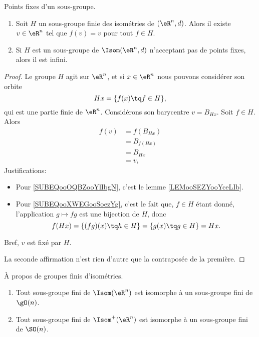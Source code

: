 \begin{proposition}     \label{PROPooLAEBooWdcBoe}
    Points fixes d'un sous-groupe.
    \begin{enumerate}
        \item
            Soit \( H\) un sous-groupe finie des isométries de \( (\eR^n,d)\). Alors il existe \( v\in \eR^n\) tel que \( f(v)=v\) pour tout \( f\in H\).
        \item
            Si \( H\) est un sous-groupe de \( \Isom(\eR^n,d)\) n'acceptant pas de points fixes, alors il est infini.
    \end{enumerate}
\end{proposition}

\begin{proof}
    Le groupe \( H\) agit sur \( \eR^n\), et si \( x\in \eR^n\) nous pouvons considérer son orbite 
    \begin{equation}
        Hx=\{f(x)\tq f\in H\},
    \end{equation}
    qui est une partie finie de \( \eR^n\). Considérons son barycentre $v=B_{Hx}$. Soit \( f\in H\). Alors  
    \begin{subequations}
        \begin{align}
            f(v)&=f(B_{Hx})\\
            &=B_{f(Hx)}     \label{SUBEQooOQBZooYlIbgN}\\
            &=B_{Hx}        \label{SUBEQooXWEGooSoezYg}\\
            &=v,
        \end{align}
    \end{subequations}
    Justifications:
    \begin{itemize}
        \item Pour \eqref{SUBEQooOQBZooYlIbgN}, c'est le lemme \ref{LEMooSEZYooYceLIb}.
        \item Pour \eqref{SUBEQooXWEGooSoezYg}, c'est le fait que, \( f\in H\) étant donné, l'application \( g\mapsto fg\) est une bijection de \( H\), donc
            \begin{equation}
                f(Hx)=\{(fg)(x)\tq h\in H\}=\{g(x)\tq g\in H\}=Hx.
            \end{equation}
    \end{itemize}
    Bref, \( v\) est fixé par \( H\).

    La seconde affirmation n'est rien d'autre que la contraposée de la première.
\end{proof}

\begin{proposition}     \label{PROPooEUFIooDUIYzi}
    À propos de groupes finis d'isométries.
    \begin{enumerate}
        \item
            Tout sous-groupe fini de \( \Isom(\eR^n)\) est isomorphe à un sous-groupe fini de \( \gO(n)\).
        \item
            Tout sous-groupe fini de \( \Isom^+(\eR^n)\) est isomorphe à un sous-groupe fini de \( \SO(n)\).
    \end{enumerate}
\end{proposition}

